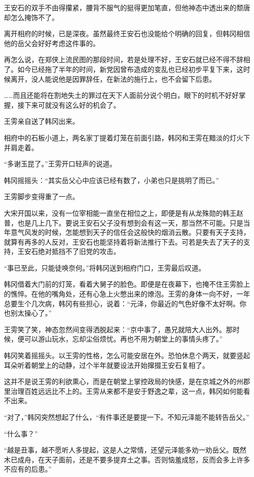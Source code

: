王安石的双手不由得攥紧，腰背不服气的挺得更加笔直，但他神态中透出来的颓唐却怎么掩饰不了。

离开相府的时候，已是深夜。虽然最终王安石也没能给个明确的回复，但韩冈相信他的岳父会好好考虑这件事的。

再怎么说，在郑侠上流民图的那段时间，若是处理不好，王安石就已经不得不辞相了。如今已经拖了半年的时间，新党因曾布造成的变乱也已经初步平复下来，这时候离开，没人能说他是因罪辞任，在新法的施行上，也不会留下后患。

……而且还能将在割地失土的罪过在天下人面前分说个明白，眼下的时机不好好掌握，接下来可就没有这么好的机会了。

王雱亲自送了韩冈出来。

相府中的石板小道上，两名家丁提着灯笼在前面引路，韩冈和王雱在黯淡的灯火下并肩走着。

“多谢玉昆了。”王雱开口轻声的说道。

韩冈摇摇头：“其实岳父心中应该已经有数了，小弟也只是挑明了而已。”

王雱脚步变得重了一点。

大宋开国以来，没有一位宰相能一直坐在相位之上，即便是有从龙殊勋的韩王赵普，也是几上几下。要说王安石父子没有想到会有这一天，那当然不可能。只是当年意气风发的时候，怎能想到天子的信任会这般快的烟消云散。只要有天子支持，就算有再多的人反对，王安石也能坚持着将新法推行下去。可若是失去了天子的支持，王安石绝对抵挡不了旧党的攻击。

“事已至此，只能徒唤奈何。”将韩冈送到相府门口，王雱最后叹道。

韩冈借着大门前的灯笼，看着大舅子的脸色。即便是在夜幕下，也掩不住王雱脸上的憔悴。在他的嘴角处，还有心急上火憋出来的燎泡。王雱的身体一向不好，一年总要生个几次病，韩冈有些担心，说着：“元泽，你最近的气色好像不太好啊。你也别太操心了。”

王雱笑了笑，神态忽然间变得洒脱起来：“京中事了，愚兄就陪大人出外。那时候，便可以游山玩水，忘却尘俗烦忧。再也不用为朝堂上的事情头疼了。”

韩冈笑着摇摇头。以王雱的性格，怎么可能安居在外。恐怕休息个两天，就要竖起耳朵听着朝堂上的动静，过个半年就要设法开始撺掇王安石复相了。

这并不是说王雱的利欲熏心，而是在朝堂上掌控政局的快感，是在京城之外的州郡里治理百姓远远比不上的。王雱从来都不是安于野逸之辈，这一点，韩冈如何能看不出来。

“对了，”韩冈突然想起了什么，“有件事还是要提一下。不知元泽能不能转告岳父。”

“什么事？”

“越是丑事，越不愿听人多提起，这是人之常情，还望元泽能多劝一劝岳父。既然木已成舟，在天子面前，还是不要多提弃土之事。否则恼羞成怒，反而会多上许多不应有的后患。”

